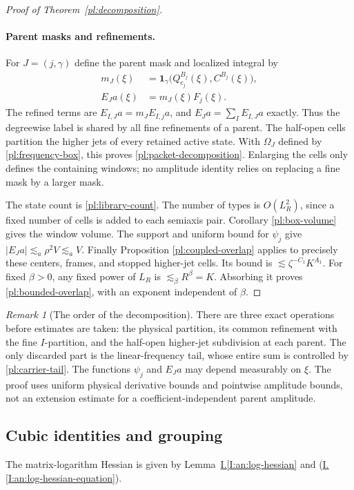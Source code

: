 \documentclass[11pt]{amsart}
\theoremstyle{definition}
\theoremstyle{remark}
\newtheorem{remark}[theorem]{Remark}
\numberwithin{equation}{section}
\newcommand{\partIref}[1]{\hyperref[I:#1]{I.\ref*{I:#1}}}
\newcommand{\partIeqref}[1]{\textup{(\partIref{#1})}}
\begin{document}
\begin{proof}[Proof of Theorem~\ref{pl:decomposition}]
\paragraph{Parent masks and refinements.}
For $J=(j,\gamma)$ define the parent mask and localized integral by
\begin{equation}\label{pl:localized-integral}
\begin{split}
m_J(\xi)&=\mathbf1_\gamma\bigl(Q_{c_j}^{B_j}(\xi),C^{B_j}(\xi)\bigr),\\
E_Ja(\xi)&=m_J(\xi)F_j(\xi).
\end{split}
\end{equation}
The refined terms are $E_{I,J}a=m_JE_{I,j}a$, and $E_Ja=\sum_IE_{I,J}a$ exactly. Thus the degreewise label is shared by all fine refinements of a parent. The half-open cells partition the higher jets of every retained active state. With $\Omega_J$ defined by \eqref{pl:frequency-box}, this proves \eqref{pl:packet-decomposition}. Enlarging the cells only defines the containing windows; no amplitude identity relies on replacing a fine mask by a larger mask.

The state count is \eqref{pl:library-count}. The number of types is $O(L_R^2)$, since a fixed number of cells is added to each semiaxis pair. Corollary \ref{pl:box-volume} gives the window volume. The support and uniform bound for $\psi_j$ give $|E_Ja|\lesssim_a\rho^2V\lesssim_a V$. Finally Proposition \ref{pl:coupled-overlap} applies to precisely these centers, frames, and stopped higher-jet cells. Its bound is $\lesssim\zeta^{-C_1}K^{A_1}$. For fixed $\beta>0$, any fixed power of $L_R$ is $\lesssim_\beta R^\beta=K$. Absorbing it proves \eqref{pl:bounded-overlap}, with an exponent independent of $\beta$.
\end{proof}

\begin{remark}[The order of the decomposition]
There are three exact operations before estimates are taken: the physical partition, its common refinement with the fine $I$-partition, and the half-open higher-jet subdivision at each parent. The only discarded part is the linear-frequency tail, whose entire sum is controlled by \eqref{pl:carrier-tail}. The functions $\psi_j$ and $E_Ja$ may depend measurably on $\xi$. The proof uses uniform physical derivative bounds and pointwise amplitude bounds, not an extension estimate for a coefficient-independent parent amplitude.
\end{remark}

\subsection{Cubic identities and grouping}\label{sup:cubic-alternatives}
The matrix-logarithm Hessian is given by Lemma~\partIref{an:log-hessian} and \partIeqref{an:log-hessian-equation}.
\end{document}

